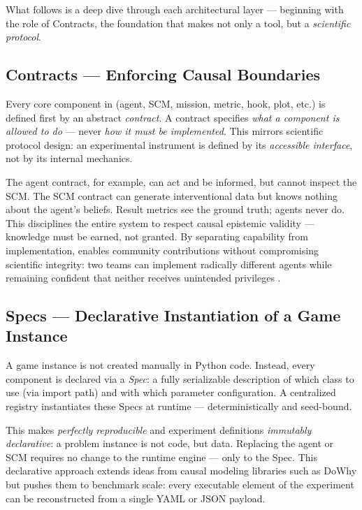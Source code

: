 \medskip
What follows is a deep dive through each architectural layer — beginning with the role of Contracts, the foundation that makes \game not only a tool, but a \emph{scientific protocol}.

\subsection{Contracts — Enforcing Causal Boundaries}

Every core component in \game (agent, SCM, mission, metric, hook, plot, etc.) is defined first by an abstract \emph{contract}.  
A contract specifies \emph{what a component is allowed to do} — never \emph{how it must be implemented}.  
This mirrors scientific protocol design: an experimental instrument is defined by its \emph{accessible interface}, not by its internal mechanics.

The agent contract, for example, can act and be informed, but cannot inspect the SCM.  
The SCM contract can generate interventional data but knows nothing about the agent’s beliefs.  
Result metrics see the ground truth; agents never do.  
This disciplines the entire system to respect causal epistemic validity — knowledge must be earned, not granted.
By separating capability from implementation, \game enables community contributions without compromising scientific integrity: two teams can implement radically different agents while remaining confident that neither receives unintended privileges \citep{BayesianCausalDiscovery2023}.

\subsection{Specs — Declarative Instantiation of a Game Instance}
\label{sec:specs}

A game instance is not created manually in Python code.  
Instead, every component is declared via a \emph{Spec}: a fully serializable description of
which class to use (via import path) and with which parameter configuration.  
A centralized registry instantiates these Specs at runtime — deterministically and seed-bound.

This makes \game \emph{perfectly reproducible} and experiment definitions \emph{immutably declarative}:  
a problem instance is not code, but data.  
Replacing the agent or SCM requires no change to the runtime engine — only to the Spec.
This declarative approach extends ideas from causal modeling libraries such as DoWhy \citep{DoWhy2021} but pushes them to benchmark scale: every executable element of the experiment can be reconstructed from a single YAML or JSON payload.

